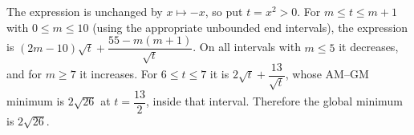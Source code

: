 The expression is unchanged by $x\mapsto-x$, so put $t=x^2>0$. For $m\le t\le m+1$ with $0\le m\le10$ (using the appropriate unbounded end intervals), the expression is $(2m-10)\sqrt t+\dfrac{55-m(m+1)}{\sqrt t}$. On all intervals with $m\le5$ it decreases, and for $m\ge7$ it increases. For $6\le t\le7$ it is $2\sqrt t+\dfrac{13}{\sqrt t}$, whose AM--GM minimum is $2\sqrt{26}$ at $t=\dfrac{13}{2}$, inside that interval. Therefore the global minimum is $\boxed{2\sqrt{26}}$.
